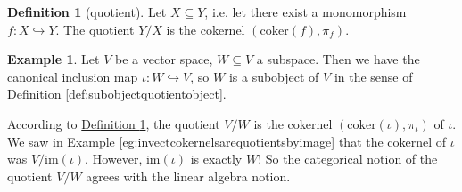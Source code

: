 \documentclass[a4paper,10pt]{scrreprt}
\newcommand{\defn}[1]{\ul{#1}}
\newcommand{\coker}{\mathrm{coker}}
\newcommand{\im}{\mathrm{im}}
\theoremstyle{definition}
\newtheorem{definition}{Definition}[section]
\newtheorem{example}{Example}[section]
\theoremstyle{plain}
\newtheorem{lemma}{Lemma}[section]
\theoremstyle{remark}
\begin{document}
%

\begin{definition}[quotient]
  \label{def:quotient}
  Let $X \subseteq Y$, i.e. let there exist a monomorphism $f\colon X \hookrightarrow Y$. The \defn{quotient} $Y/X$ is the cokernel $(\coker(f), \pi_{f})$.
\end{definition}

\begin{example}
  Let $V$ be a vector space, $W \subseteq V$ a subspace. Then we have the canonical inclusion map $\iota\colon W \hookrightarrow V$, so $W$ is a subobject of $V$ in the sense of \hyperref[def:subobjectquotientobject]{Definition \ref*{def:subobjectquotientobject}}.

  According to \hyperref[def:quotient]{Definition \ref*{def:quotient}}, the quotient $V / W$ is the cokernel $(\coker(\iota), \pi_{\iota})$ of $\iota$. We saw in \hyperref[eg:invectcokernelsarequotientsbyimage]{Example \ref*{eg:invectcokernelsarequotientsbyimage}} that the cokernel of $\iota$ was $V / \im(\iota)$. However, $\im(\iota)$ is exactly $W$! So the categorical notion of the quotient $V / W$ agrees with the linear algebra notion.
\end{example}
\end{document}
